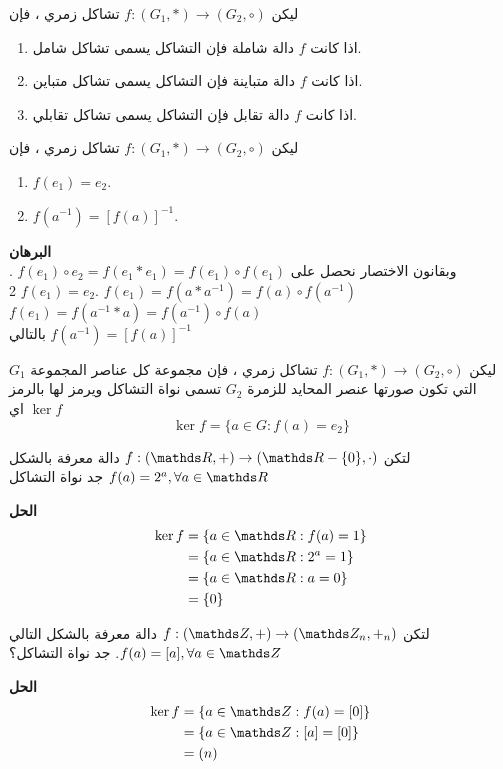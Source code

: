\begin{definition}
	ليكن 
	$f : (G_1, *) \to (G_2, \circ)$ تشاكل زمري ، فإن
	\begin{enumerate}
		\item اذا كانت $f$ دالة شاملة فإن التشاكل يسمى تشاكل شامل.
		\item اذا كانت $f$ دالة متباينة فإن التشاكل يسمى تشاكل متباين.
		\item اذا كانت $f$ دالة تقابل فإن التشاكل يسمى تشاكل تقابلي.
	\end{enumerate}
\end{definition}
\newpage
\begin{theorem}
	ليكن 	$f : (G_1, *) \to (G_2, \circ)$ تشاكل زمري ، فإن
	\begin{enumerate}[leftmargin=*]
		\item $f(e_1) = e_2$.
		\item  $f(a^{-1}) = [f(a)]^{-1}$.
	\end{enumerate}
\end{theorem}
\noindent
\textbf{البرهان}\\
. $f(e_1)  \circ e_2= f(e_1 * e_1) = f(e_1) \circ f(e_1)$ وبقانون الاختصار نحصل على $f(e_1) = e_2$
2. $f(e_1) = f(a * a^{-1}) = f(a) \circ f(a^{-1})$\\
\hspace*{9pt} $f(e_1) = f(a^{-1} * a) = f(a^{-1}) \circ f(a)$\\
\hspace*{9pt} بالتالي $f(a^{-1}) = [f(a)]^{-1}$

\begin{definition}
		ليكن 	$f : (G_1, *) \to (G_2, \circ)$ تشاكل زمري ، فإن مجموعة كل عناصر المجموعة $G_1$ التي تكون صورتها عنصر المحايد للزمرة $G_2$ تسمى نواة التشاكل ويرمز لها بالرمز $\ker f$ اي
		\[
		\ker f = \{a\in G : f(a) = e_2\}
		\]
\end{definition}

\begin{example}
	لتكن
	$f : (\R, +) \to (\R-\{0\}, \cdot)$
	دالة معرفة بالشكل 
	$f(a) = 2^a, \forall a\in \R$
	جد نواة التشاكل
\end{example}
\noindent
\textbf{الحل}
\begin{align*}
	\ker f &= \{a \in \R  : f(a) = 1\}\\
&= \{a\in \R : 2^a = 1\}\\
&= \{a\in \R : a =0 \}\\
&= \{0\}
\end{align*}
	\begin{example}
		لتكن 
		$f : (\Z, +) \to (\Z_n, +_n)$ دالة معرفة بالشكل التالي $f(a) = [a], \forall a\in \Z$. جد نواة التشاكل؟
	\end{example}
	\noindent
	\textbf{الحل}
	\begin{align*}
		 \ker f &= \{a \in \Z: f(a) = [0]\}\\
		 &= \{a\in \Z: [a] = [0]\}\\
&= (n)
	\end{align*}
	
